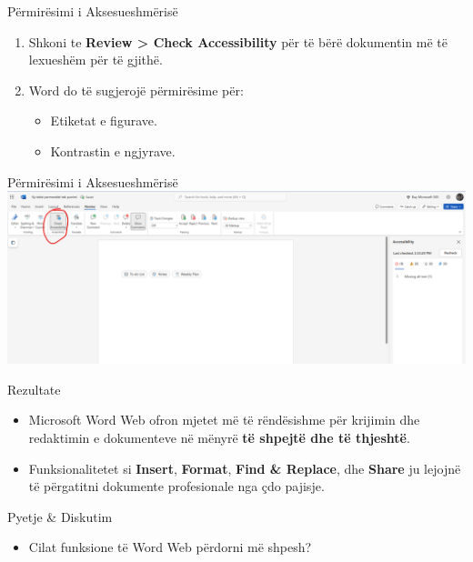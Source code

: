 \documentclass[
  ignorenonframetext,
]{beamer}
\providecommand{\tightlist}{%
  \setlength{\itemsep}{0pt}\setlength{\parskip}{0pt}}
\begin{document}
\begin{frame}{Përmirësimi i Aksesueshmërisë}
\label{puxebrmiruxebsimi-i-aksesueshmuxebrisuxeb}
\begin{enumerate}
\item
  Shkoni te \textbf{Review \textgreater{} Check Accessibility} për të
  bërë dokumentin më të lexueshëm për të gjithë.
\item
  Word do të sugjerojë përmirësime për:

  \begin{itemize}
  \item
    Etiketat e figurave.
  \item
    Kontrastin e ngjyrave.
  \end{itemize}
\end{enumerate}
\end{frame}

\begin{frame}{Përmirësimi i Aksesueshmërisë}
\label{puxebrmiruxebsimi-i-aksesueshmuxebrisuxeb-1}
\includegraphics{./images/word26.png}
\end{frame}

\begin{frame}{Rezultate}
\label{rezultate-4}
\begin{itemize}
\item
  Microsoft Word Web ofron mjetet më të rëndësishme për krijimin dhe
  redaktimin e dokumenteve në mënyrë \textbf{të shpejtë dhe të
  thjeshtë}.
\item
  Funksionalitetet si \textbf{Insert}, \textbf{Format}, \textbf{Find \&
  Replace}, dhe \textbf{Share} ju lejojnë të përgatitni dokumente
  profesionale nga çdo pajisje.
\end{itemize}
\end{frame}

\begin{frame}{Pyetje \& Diskutim}
\label{pyetje-diskutim-4}
\begin{itemize}
\tightlist
\item
  Cilat funksione të Word Web përdorni më shpesh?
\end{itemize}
\end{frame}
\end{document}
